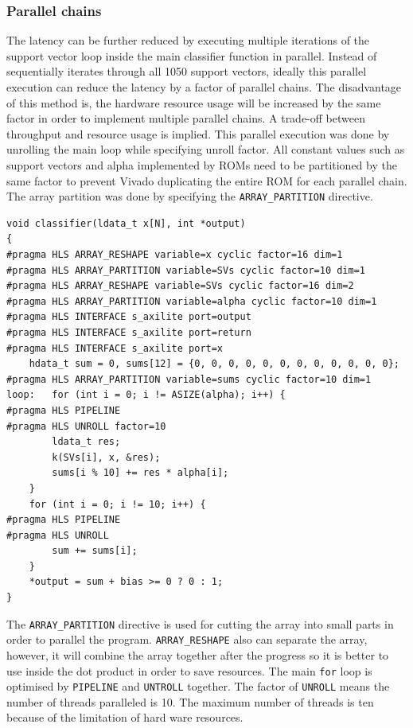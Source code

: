 \documentclass[journal]{IEEEtran}
\begin{document}
\subsubsection{Parallel chains}

The latency can be further reduced by executing multiple iterations of the support vector loop inside the main classifier function in parallel. Instead of sequentially iterates through all 1050 support vectors, ideally this parallel execution can reduce the latency by a factor of parallel chains.
The disadvantage of this method is, the hardware resource usage will be increased by the same factor in order to implement multiple parallel chains. A trade-off between throughput and resource usage is implied.
This parallel execution was done by unrolling the main loop while specifying unroll factor. All constant values such as support vectors and alpha implemented by ROMs need to be partitioned by the same factor to prevent Vivado duplicating the entire ROM for each parallel chain. The array partition was done by specifying the \texttt{ARRAY\_PARTITION} directive.

\begin{lstlisting}[caption={Optimised classifier top-level function},captionpos=b,label=lst:opt_cla]
void classifier(ldata_t x[N], int *output)
{
#pragma HLS ARRAY_RESHAPE variable=x cyclic factor=16 dim=1
#pragma HLS ARRAY_PARTITION variable=SVs cyclic factor=10 dim=1
#pragma HLS ARRAY_RESHAPE variable=SVs cyclic factor=16 dim=2
#pragma HLS ARRAY_PARTITION variable=alpha cyclic factor=10 dim=1
#pragma HLS INTERFACE s_axilite port=output
#pragma HLS INTERFACE s_axilite port=return
#pragma HLS INTERFACE s_axilite port=x
	hdata_t sum = 0, sums[12] = {0, 0, 0, 0, 0, 0, 0, 0, 0, 0, 0, 0};
#pragma HLS ARRAY_PARTITION variable=sums cyclic factor=10 dim=1
loop:	for (int i = 0; i != ASIZE(alpha); i++) {
#pragma HLS PIPELINE
#pragma HLS UNROLL factor=10
		ldata_t res;
		k(SVs[i], x, &res);
		sums[i % 10] += res * alpha[i];
	}
	for (int i = 0; i != 10; i++) {
#pragma HLS PIPELINE
#pragma HLS UNROLL
		sum += sums[i];
	}
	*output = sum + bias >= 0 ? 0 : 1;
}
\end{lstlisting}

The \texttt{ARRAY\_PARTITION} directive is used for cutting the array into small parts in order to parallel the program. \texttt{ARRAY\_RESHAPE} also can separate the array, however, it will combine the array together after the progress so it is better to use inside the dot product in order to save resources. The main \texttt{for} loop is optimised by \texttt{PIPELINE} and \texttt{UNTROLL} together. The factor of \texttt{UNROLL} means the number of threads paralleled is 10. The maximum number of threads is ten because of the limitation of hard ware resources. 
\end{document}
